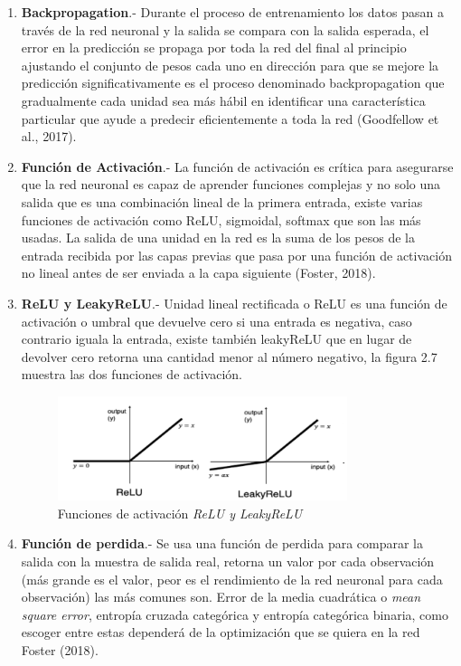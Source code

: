 \documentclass[letter, openright, 12pt]{book}
\newcommand*\setcaptioncitation[1]{\def\captioncitation{\textit{Fuente:}~#1}}
\let\captioncitation\relax
\begin{document}
\begin{enumerate}[label=(\alph*)]
\item \textbf{Backpropagation}.- Durante el proceso de entrenamiento los datos pasan a través de la red neuronal y la salida se compara con la salida esperada, el error en la predicción se propaga por toda la red del final al principio ajustando el conjunto de pesos cada uno en dirección para que se mejore la predicción significativamente es el proceso denominado backpropagation que gradualmente cada unidad sea más hábil en identificar una característica particular que ayude a predecir eficientemente a toda la red  (Goodfellow et al., 2017).
\item \textbf{Función de Activación}.- La función de activación es crítica para asegurarse que la red neuronal es capaz de aprender funciones complejas y no solo una salida que es una combinación lineal de la primera entrada, existe varias funciones de activación como ReLU, sigmoidal, softmax que son las más usadas. La salida de una unidad en la red es la suma de los pesos de la entrada recibida por las capas previas que pasa por una función de activación no lineal antes de ser enviada a la capa siguiente (Foster, 2018).
\item \textbf{ReLU y LeakyReLU}.- Unidad lineal rectificada o ReLU es una función de activación o umbral que devuelve cero si una entrada es negativa, caso contrario iguala la entrada, existe también leakyReLU que en lugar de devolver cero retorna una cantidad menor al número negativo, la figura 2.7 muestra las dos funciones de activación.

\begin{figure}[H]
\includegraphics[width=0.8\textwidth]{figura2_7}
\setcaptioncitation{(Foster, 2018)}
\caption{Funciones de activación \textit{ReLU y LeakyReLU} }
\label{tab:figura2_7} 
\end{figure}

\item \textbf{Función de perdida}.- Se usa una función de perdida para comparar la salida con la muestra de salida real, retorna un valor por cada observación (más grande es el valor, peor es el rendimiento de la red neuronal para cada observación) las más comunes son. Error de la media cuadrática o \textit{mean square error}, entropía cruzada categórica y entropía categórica binaria, como escoger entre estas dependerá de la optimización que se quiera en la red Foster (2018).


\end{enumerate}
\end{document}
